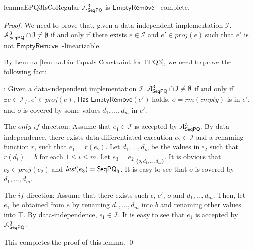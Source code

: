 \begin{restatable}{lemma}{EPQ3IsCoRegular}
\label{lemma:EPQ3 is co-regular}
$\mathcal{A}_{\mathsf{SeqPQ}}^3$ is $\mathsf{EmptyRemove}^{=}$-complete. 
\end{restatable}

\begin {proof} 

We need to prove that, given a data-independent implementation $\mathcal{I}$. $\mathcal{A}_{\mathsf{SeqPQ}}^3 \cap \mathcal{I} \neq \emptyset$ if and only if there exists $e \in \mathcal{I}$ and $e' \in \textit{proj}(e)$ such that $e'$ is not $\mathsf{EmptyRemove}^{=}$-linearizable.

By Lemma \ref{lemma:Lin Equals Constraint for EPQ3}, we need to prove the following fact:

: Given a data-independent implementation $\mathcal{I}$. $\mathcal{A}_{\mathsf{SeqPQ}}^3 \cap \mathcal{I} \neq \emptyset$ if and only if $\exists e \in \mathcal{I}_{\neq},e' \in \textit{proj}(e)$, $\mathsf{Has\text{-}EmptyRemove}(e')$ holds, $o = \textit{rm}(\textit{empty})$ is in $e'$, and $o$ is covered by some values $d_1,\ldots,d_m$ in $e'$. 


\noindent The $\textit{only if}$ direction: Assume that $e_1 \in \mathcal{I}$ is accepted by $\mathcal{A}_{\mathsf{SeqPQ}}^3$. By data-independence, there exists data-differentiated execution $e_2 \in \mathcal{I}$ and a renaming function $r$, such that $e_1=r(e_2)$. Let $d_1,\ldots,d_m$ be the values in $e_2$ such that $r(d_i)=b$ for each $1 \leq i \leq m$. Let $e_3 = e_2 \vert_{ \{ o, d_1, \ldots, d_m \} }$. It is obvious that $e_3 \in \textit{proj}(e_2)$ and $\textit{last}(e_3) = \mathsf{SeqPQ}_3$. It is easy to see that $o$ is covered by $d_1,\ldots,d_m$.

\noindent The $\textit{if}$ direction: Assume that there exists such $e$, $e'$, $o$ and $d_1,\ldots,d_m$. Then, let $e_1$ be obtained from $e$ by renaming $d_1,\ldots,d_m$ into $b$ and renaming other values into $\top$. By data-independence, $e_1 \in \mathcal{I}$. It is easy to see that $e_1$ is accepted by $\mathcal{A}_{\mathsf{SeqPQ}}^3$.

This completes the proof of this lemma. \qed
\end {proof}






